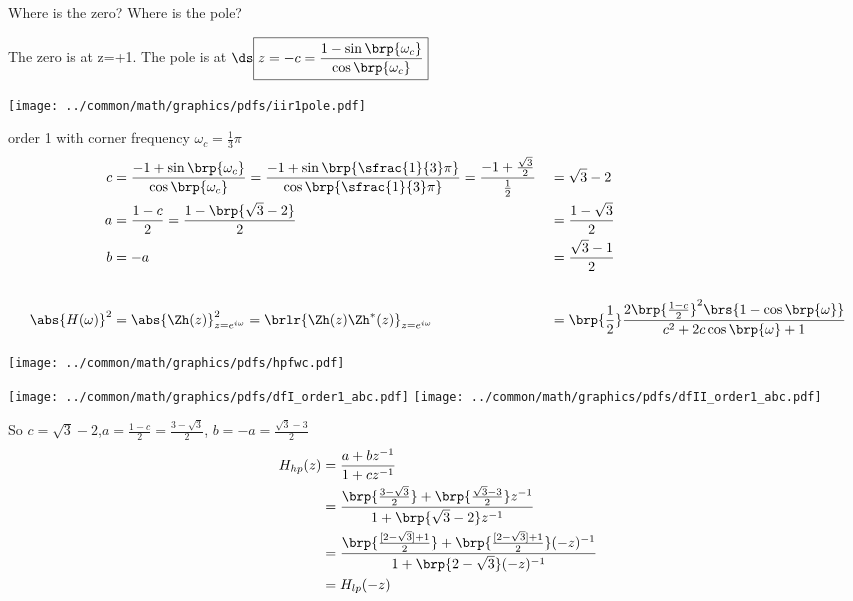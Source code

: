 Where is the zero? Where is the pole?

The zero is at z=+1. \qquad The pole is at 
$\ds\boxed{z=-c = \frac{1 - \sin\brp{\omega_c}}
                    {\cos\brp{\omega_c}}}$

\texttt{[image: ../common/math/graphics/pdfs/iir1pole.pdf]}


\begin{example}order 1  with corner frequency $\omega_c=\frac{1}{3}\pi$
\begin{align*}
  c &= \frac{-1 + \sin\brp{\omega_c}}{\cos\brp{\omega_c}}
     = \frac{-1 + \sin\brp{\sfrac{1}{3}\pi}}{\cos\brp{\sfrac{1}{3}\pi}}
     = \frac{-1 + \frac{\sqrt{3}}{2}}{\frac{1}{2}}
   &&= \sqrt{3} - 2
  \\
  a &= \frac{1-c}{2}
     = \frac{1-\brp{\sqrt{3} - 2}}{2}
   &&= \frac{1-\sqrt{3}}{2}
  \\
  b &= -a
   &&= \frac{\sqrt{3} - 1}{2}
  \\
  \\
  \abs{H(\omega)}^2
    &= \abs{\Zh(z)}^2_{z=e^{i\omega}}
     = \brlr{\Zh(z)\Zh^\ast(z)}_{z=e^{i\omega}}
   &&= \brp{\frac{1}{2}}\frac{2\brp{\frac{1-c}{2}}^2\brs{1 -  \cos\brp{\omega}}}
            {c^2 + 2 c\cos\brp{\omega} + 1}
\end{align*}


\texttt{[image: ../common/math/graphics/pdfs/hpfwc.pdf]}

\texttt{[image: ../common/math/graphics/pdfs/dfI\_order1\_abc.pdf]}
\texttt{[image: ../common/math/graphics/pdfs/dfII\_order1\_abc.pdf]}
\end{example}


So $c=\sqrt{3}-2$,\qquad $a=\frac{1-c}{2}=\frac{3-\sqrt{3}}{2}$, \qquad $b=-a=\frac{\sqrt{3}-3}{2}$
\begin{align*}
  H_{hp}(z)
    &= \frac{a + bz^{-1}}{1+cz^{-1}}
  \\&= \frac{\brp{\frac{3-\sqrt{3}}{2}} + \brp{\frac{\sqrt{3}-3}{2}}z^{-1}}
            {1+\brp{\sqrt{3}-2}z^{-1}}
  \\&= \frac{\brp{\frac{[2-\sqrt{3}]+1}{2}} + \brp{\frac{[2-\sqrt{3}]+1}{2}}(-z)^{-1}}
            {1+\brp{2-\sqrt{3}}(-z)^{-1}}
  \\&= H_{lp}(-z)
\end{align*}



